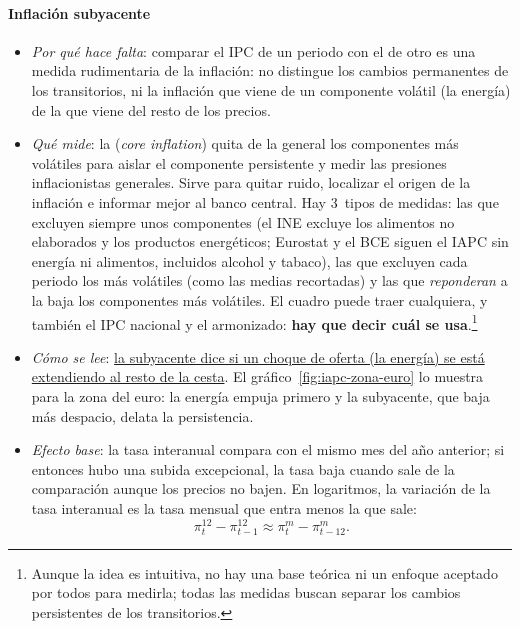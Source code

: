 \documentclass[11pt]{article}
\begin{document}
\begin{infografia}[!htb]
\centering
\caption{IPC y deflactor del PIB: qué compara cada uno y por qué se separan}\label{figu:esquema-indices}
\end{infografia}

\paragraph{Inflación subyacente}
\begin{itemize}
\item \emph{Por qué hace falta}: comparar el IPC de un periodo con el de otro es una medida rudimentaria de la inflación: no distingue los cambios permanentes de los transitorios, ni la inflación que viene de un componente volátil (la energía) de la que viene del resto de los precios.
\item \emph{Qué mide}: la  (\emph{core inflation}) quita de la general los componentes más volátiles para aislar el componente persistente y medir las presiones inflacionistas generales. Sirve para quitar ruido, localizar el origen de la inflación e informar mejor al banco central. Hay 3~tipos de medidas: las que excluyen siempre unos componentes (el INE excluye los alimentos no elaborados y los productos energéticos; Eurostat y el BCE siguen el IAPC sin energía ni alimentos, incluidos alcohol y tabaco), las que excluyen cada periodo los más volátiles (como las medias recortadas) y las que \emph{reponderan} a la baja los componentes más volátiles. El cuadro puede traer cualquiera, y también el IPC nacional y el armonizado: \textbf{hay que decir cuál se usa}.\footnote{Aunque la idea es intuitiva, no hay una base teórica ni un enfoque aceptado por todos para medirla; todas las medidas buscan separar los cambios persistentes de los transitorios.}
\item \emph{Cómo se lee}: \uline{la subyacente dice si un choque de oferta (la energía) se está extendiendo al resto de la cesta}. El gráfico~\ref{fig:iapc-zona-euro} lo muestra para la zona del euro: la energía empuja primero y la subyacente, que baja más despacio, delata la persistencia.
\item \emph{Efecto base}: la tasa interanual compara con el mismo mes del año anterior; si entonces hubo una subida excepcional, la tasa baja cuando sale de la comparación aunque los precios no bajen. En logaritmos, la variación de la tasa interanual es la tasa mensual que entra menos la que sale:
\begin{equation}\label{eq:efecto-base}
\pi^{12}_t-\pi^{12}_{t-1}\approx\pi^{m}_t-\pi^{m}_{t-12} .
\end{equation}
\end{itemize}
\end{document}
